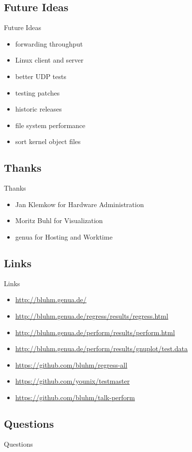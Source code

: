 \documentclass[14pt,aspectratio=169]{beamer}
\begin{document}
\subsection{Future Ideas}
\begin{frame}{Future Ideas}
\begin{itemize}
    \item forwarding throughput
    \item Linux client and server
    \item better UDP tests
    \item testing patches
    \item historic releases
    \item file system performance
    \item sort kernel object files
\end{itemize}
\end{frame}

\subsection{Thanks}
\begin{frame}{Thanks}
\begin{itemize}
    \item Jan Klemkow for Hardware Administration
    \item Moritz Buhl for Visualization
    \item genua for Hosting and Worktime
\end{itemize}
\end{frame}

\subsection{Links}
\begin{frame}{Links}
\begin{itemize}
    \small
    \item \url{http://bluhm.genua.de/}
    \item \url{http://bluhm.genua.de/regress/results/regress.html}
    \item \url{http://bluhm.genua.de/perform/results/perform.html}
    \item \url{http://bluhm.genua.de/perform/results/gnuplot/test.data}
    \item \url{https://github.com/bluhm/regress-all}
    \item \url{https://github.com/younix/testmaster}
    \item \url{https://github.com/bluhm/talk-perform}
\end{itemize}
\end{frame}

\subsection{Questions}
\begin{frame}{Questions}
\begin{center}
\end{center}
\end{frame}
\end{document}
